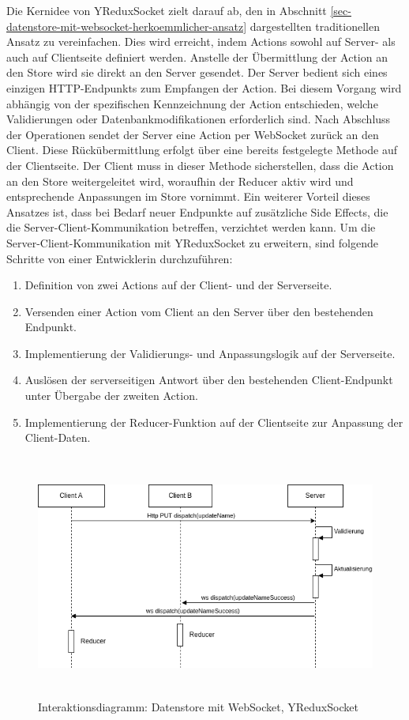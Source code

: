 \documentclass[12pt]{book}          %
\begin{document}
Die Kernidee von YReduxSocket zielt darauf ab, den in Abschnitt \ref{sec-datenstore-mit-websocket-herkoemmlicher-ansatz} dargestellten traditionellen Ansatz zu vereinfachen. Dies wird erreicht, indem Actions sowohl auf Server- als auch auf Clientseite definiert werden. Anstelle der Übermittlung der Action an den Store wird sie direkt an den Server gesendet. Der Server bedient sich eines einzigen HTTP-Endpunkts zum Empfangen der Action. Bei diesem Vorgang wird abhängig von der spezifischen Kennzeichnung der Action entschieden, welche Validierungen oder Datenbankmodifikationen erforderlich sind. Nach Abschluss der Operationen sendet der Server eine Action per WebSocket zurück an den Client. Diese Rückübermittlung erfolgt über eine bereits festgelegte Methode auf der Clientseite. Der Client muss in dieser Methode sicherstellen, dass die Action an den Store weitergeleitet wird, woraufhin der Reducer aktiv wird und entsprechende Anpassungen im Store vornimmt. Ein weiterer Vorteil dieses Ansatzes ist, dass bei Bedarf neuer Endpunkte auf zusätzliche Side Effects, die die Server-Client-Kommunikation betreffen, verzichtet werden kann. Um die Server-Client-Kommunikation mit YReduxSocket zu erweitern, sind folgende Schritte von einer Entwicklerin durchzuführen:
\begin{enumerate}
    \item Definition von zwei Actions auf der Client- und der Serverseite.
    \item Versenden einer Action vom Client an den Server über den bestehenden Endpunkt.
    \item Implementierung der Validierungs- und Anpassungslogik auf der Serverseite.
    \item Auslösen der serverseitigen Antwort über den bestehenden Client-Endpunkt unter Übergabe der zweiten Action.
    \item Implementierung der Reducer-Funktion auf der Clientseite zur Anpassung der Client-Daten.
\end{enumerate}

\begin{figure}[htbp]
\centering
\includegraphics[height=8cm]{abbildungen/store-and-socket-y-redux.png}
\caption{Interaktionsdiagramm: Datenstore mit WebSocket, YReduxSocket}
\label{store-and-socket-y-redux-socket}
\end{figure}
\end{document}
